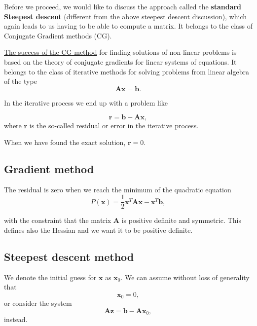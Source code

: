 \documentclass[%
oneside,                 %
final,                   %
10pt]{article}
\begin{document}
Before we proceed, we would like to discuss the approach called the
\textbf{standard Steepest descent} (different from the above steepest descent discussion), which again leads to us having to be able
to compute a matrix. It belongs to the class of Conjugate Gradient methods (CG).

\href{{https://www.cs.cmu.edu/~quake-papers/painless-conjugate-gradient.pdf}}{The success of the CG method}
for finding solutions of non-linear problems is based on the theory
of conjugate gradients for linear systems of equations. It belongs to
the class of iterative methods for solving problems from linear
algebra of the type 
\begin{equation*} 
\bm{A}\bm{x} = \bm{b}.
\end{equation*} 

In the iterative process we end up with a problem like

\begin{equation*}
  \bm{r}= \bm{b}-\bm{A}\bm{x},
\end{equation*}
where $\bm{r}$ is the so-called residual or error in the iterative process.

When we have found the exact solution, $\bm{r}=0$.

\subsection*{Gradient method}

The residual is zero when we reach the minimum of the quadratic equation
\begin{equation*}
  P(\bm{x})=\frac{1}{2}\bm{x}^T\bm{A}\bm{x} - \bm{x}^T\bm{b},
\end{equation*}

with the constraint that the matrix $\bm{A}$ is positive definite and
symmetric.  This defines also the Hessian and we want it to be  positive definite.  


\subsection*{Steepest descent  method}

We denote the initial guess for $\bm{x}$ as $\bm{x}_0$. 
We can assume without loss of generality that
\begin{equation*}
\bm{x}_0=0,
\end{equation*}
or consider the system
\begin{equation*}
\bm{A}\bm{z} = \bm{b}-\bm{A}\bm{x}_0,
\end{equation*}
instead.
\end{document}
